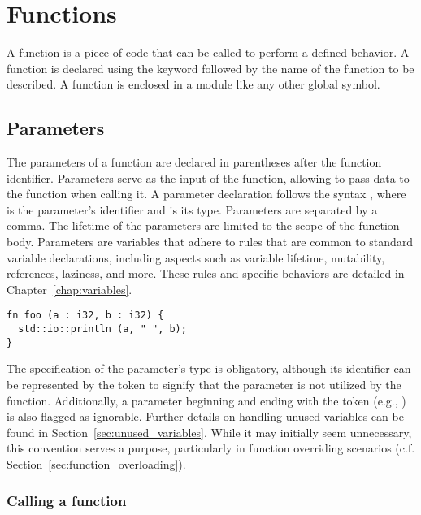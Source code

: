 \vfill%
\pagebreak

\section{Functions}%
\label{sec:functions}

A function is a piece of code that can be called to perform a defined behavior.
A function is declared using the keyword  followed by the name of the
function to be described. A function is enclosed in a module like any other
global symbol.

\subsection{Parameters}
\label{sec:function_parameters}

The parameters of a function are declared in parentheses after the function
identifier. Parameters serve as the input of the function, allowing to pass data
to the function when calling it. A parameter declaration follows the syntax
, where  is the parameter's identifier and
 is its type. Parameters are separated by a comma. The lifetime of the
parameters are limited to the scope of the function body. Parameters are
variables that adhere to rules that are common to standard variable
declarations, including aspects such as variable lifetime, mutability,
references, laziness, and more. These rules and specific behaviors are detailed
in Chapter~\ref{chap:variables}.

\begin{lstlisting}[style=coloredverbatim]
fn foo (a : i32, b : i32) {
  std::io::println (a, " ", b);
}
\end{lstlisting}

The specification of the parameter's type is obligatory, although its identifier
can be represented by the token \token{\_} to signify that the parameter is not
utilized by the function. Additionally, a parameter beginning and ending with
the token \token{\_} (e.g., ) is also flagged as ignorable. Further
details on handling unused variables can be found in
Section~\ref{sec:unused_variables}. While it may initially seem unnecessary,
this convention serves a purpose, particularly in function overriding scenarios
(c.f. Section~\ref{sec:function_overloading}).

\subsubsection*{Calling a function}

